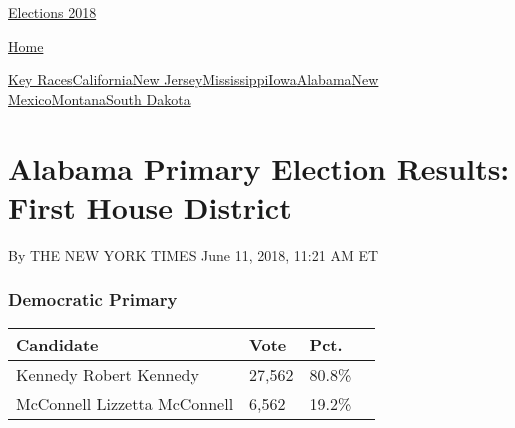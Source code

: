 \href{//www.nytimes3xbfgragh.onion}{}\href{https://www.nytimes3xbfgragh.onion/interactive/2018/us/elections/calendar-primary-results.html}{
Elections 2018}

\href{//www.nytimes3xbfgragh.onion}{ Home}

\href{https://www.nytimes3xbfgragh.onion/interactive/2018/06/05/us/elections/results-california-new-jersey-iowa-primaries.html}{Key
Races}\href{https://www.nytimes3xbfgragh.onion/interactive/2018/06/05/us/elections/results-california-primary-elections.html}{California}\href{https://www.nytimes3xbfgragh.onion/interactive/2018/06/05/us/elections/results-new-jersey-primary-elections.html}{New
Jersey}\href{https://www.nytimes3xbfgragh.onion/interactive/2018/06/05/us/elections/results-mississippi-primary-elections.html}{Mississippi}\href{https://www.nytimes3xbfgragh.onion/interactive/2018/06/05/us/elections/results-iowa-primary-elections.html}{Iowa}\href{https://www.nytimes3xbfgragh.onion/interactive/2018/06/05/us/elections/results-alabama-primary-elections.html}{Alabama}\href{https://www.nytimes3xbfgragh.onion/interactive/2018/06/05/us/elections/results-new-mexico-primary-elections.html}{New
Mexico}\href{https://www.nytimes3xbfgragh.onion/interactive/2018/06/05/us/elections/results-montana-primary-elections.html}{Montana}\href{https://www.nytimes3xbfgragh.onion/interactive/2018/06/05/us/elections/results-south-dakota-primary-elections.html}{South
Dakota}

\hypertarget{alabama-primary-election-results-first-house-district}{%
\section{Alabama Primary Election Results: First House
District}\label{alabama-primary-election-results-first-house-district}}

By THE NEW YORK TIMES June 11, 2018, 11:21 AM ET

\hypertarget{democratic-primary}{%
\subsubsection{Democratic Primary}\label{democratic-primary}}

\begin{longtable}[]{@{}llll@{}}
\toprule
Candidate & Vote & Pct. &\tabularnewline
\midrule
\endhead
 Kennedy Robert Kennedy & 27,562 & 80.8\% &\tabularnewline
 McConnell Lizzetta McConnell & 6,562 & 19.2\% &\tabularnewline
\bottomrule
\end{longtable}

